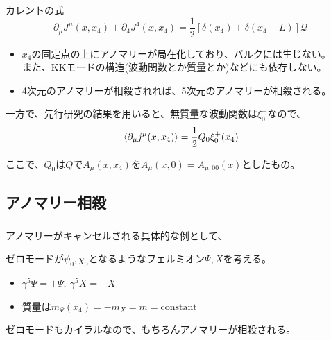\documentclass[
  unicode,a4paper,10pt,
  xcolor = {dvipsnames,svgnames},
  hyperref ={colorlinks=true,citecolor=Navy,linkcolor=NavyBlue,urlcolor=purple},
  ja=standard,lualatex
]{beamer}
\begin{document}
\begin{frame}
  
  カレントの式
  \begin{equation*}
    \partial_{\mu}J^{\mu}(x,x_{4})
    +
    \partial_{4}J^{4}(x,x_{4})
    =
    \frac{1}{2}\left[ \delta(x_{4})+\delta(x_{4}-L) \right]\mathcal{Q}
  \end{equation*}  

  \begin{itemize}
    \item 
    $x_{4}$の固定点の上にアノマリーが局在化しており、バルクには生じない。\\
    また、KKモードの構造(波動関数とか質量とか)などにも依存しない。
    \item 
    4次元のアノマリーが相殺されれば、5次元のアノマリーが相殺される。
  \end{itemize}

  一方で、先行研究\cite{Coleman:1982yg}の結果を用いると、無質量な波動関数は$\xi_{0}^{+}$なので、
  \begin{equation*}
    \ev*{\partial_{\mu}j^{\mu}(x,x_{4})}
    =
    \frac{1}{2}Q_{0}\xi_{0}^{+}(x_{4})
  \end{equation*}

  ここで、$Q_{0}$は$Q$で$A_{\mu}(x,x_{4})$を$A_{\mu}(x,0)=A_{\mu,00}(x)$としたもの。
  
\end{frame}



\subsection{アノマリー相殺}

\begin{frame}
  \frametitle{\subsecname}

  アノマリーがキャンセルされる具体的な例として、

  ゼロモードが$\psi_{0},\chi_{0}$となるようなフェルミオン$\Psi,X$を考える。
  \begin{itemize}
    \item 
    $\gamma^{5}\Psi=+\Psi,\ \gamma^{5}X=-X$
    \item 
    質量は$m_{\Psi}(x_{4})=-m_{X}=m=\mathrm{constant}$
  \end{itemize}

  ゼロモードもカイラルなので、もちろんアノマリーが相殺される。


  

\end{frame}
\end{document}
